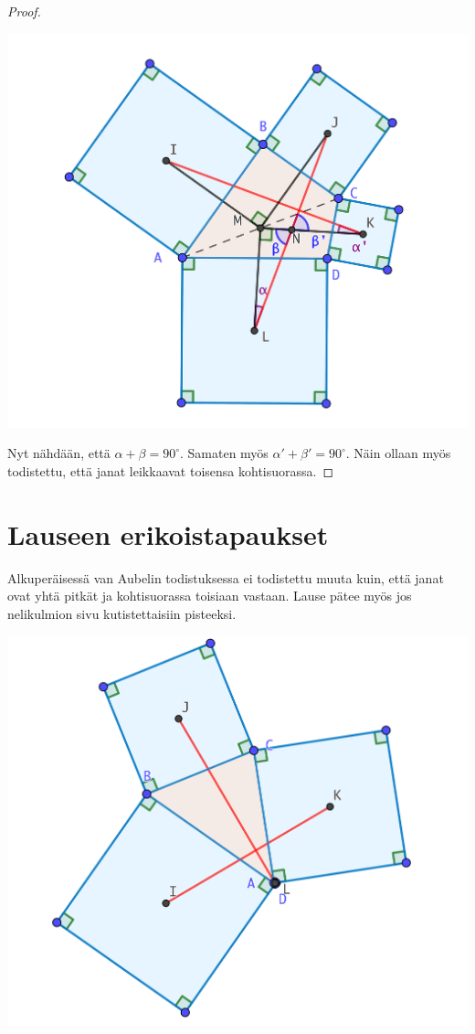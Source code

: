\documentclass{scrartcl}
\begin{document}
\begin{proof}
\begin{center}
    \includegraphics[scale=0.3]{todistuksenjatkoa.png}
\end{center}

Nyt nähdään, että $\alpha + \beta = 90^\circ$. Samaten myös $\alpha' + \beta' = 90^\circ$. Näin ollaan myös todistettu, että janat leikkaavat toisensa kohtisuorassa.
\end{proof}

\pagebreak
\section{Lauseen erikoistapaukset}
Alkuperäisessä van Aubelin todistuksessa ei todistettu muuta kuin, että janat ovat yhtä pitkät ja kohtisuorassa toisiaan vastaan. Lause pätee myös jos nelikulmion sivu kutistettaisiin pisteeksi.
\begin{center}
    \includegraphics[scale=0.15]{sivupisteeksi.png}
\end{center}
\end{document}
